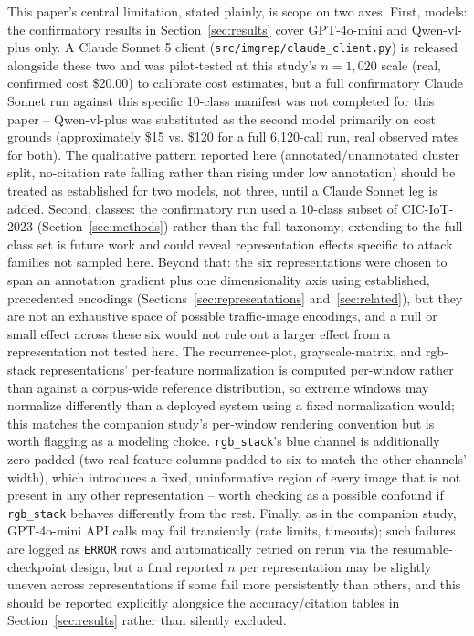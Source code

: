 \documentclass[11pt]{article}
\begin{document}
This paper's central limitation, stated plainly, is scope on two axes. First, models: the
confirmatory results in Section~\ref{sec:results} cover GPT-4o-mini and Qwen-vl-plus only. A Claude
Sonnet 5 client (\texttt{src/imgrep/claude\_client.py}) is released alongside these two and was
pilot-tested at this study's $n=1{,}020$ scale (real, confirmed cost \$20.00) to calibrate cost
estimates, but a full confirmatory Claude Sonnet run against this specific 10-class manifest was not
completed for this paper -- Qwen-vl-plus was substituted as the second model primarily on cost
grounds (approximately \$15 vs. \$120 for a full 6,120-call run, real observed rates for both). The
qualitative pattern reported here (annotated/unannotated cluster split, no-citation rate falling
rather than rising under low annotation) should be treated as established for two models, not three,
until a Claude Sonnet leg is added. Second, classes: the confirmatory run used a 10-class subset of
CIC-IoT-2023 (Section~\ref{sec:methods}) rather than the full taxonomy; extending to the full class
set is future work and could reveal representation effects specific to attack families not sampled
here. Beyond that: the six representations were chosen to span an annotation
gradient plus one dimensionality axis using established, precedented encodings
(Sections~\ref{sec:representations} and~\ref{sec:related}), but they are not an exhaustive space of
possible traffic-image encodings, and a null or small effect across these six would not rule out a
larger effect from a representation not tested here. The recurrence-plot, grayscale-matrix, and
rgb-stack representations' per-feature normalization is computed per-window rather than against a
corpus-wide reference distribution, so extreme windows may normalize differently than a deployed
system using a fixed normalization would; this matches the companion study's per-window rendering
convention but is worth flagging as a modeling choice. \texttt{rgb\_stack}'s blue channel is
additionally zero-padded (two real feature columns padded to six to match the other channels'
width), which introduces a fixed, uninformative region of every image that is not present in any
other representation -- worth checking as a possible confound if \texttt{rgb\_stack} behaves
differently from the rest. Finally, as in the companion study, GPT-4o-mini API calls may fail transiently
(rate limits, timeouts); such failures are logged as \texttt{ERROR} rows and automatically retried on
rerun via the resumable-checkpoint design, but a final reported $n$ per representation may be
slightly uneven across representations if some fail more persistently than others, and this should
be reported explicitly alongside the accuracy/citation tables in Section~\ref{sec:results} rather
than silently excluded.
\end{document}
